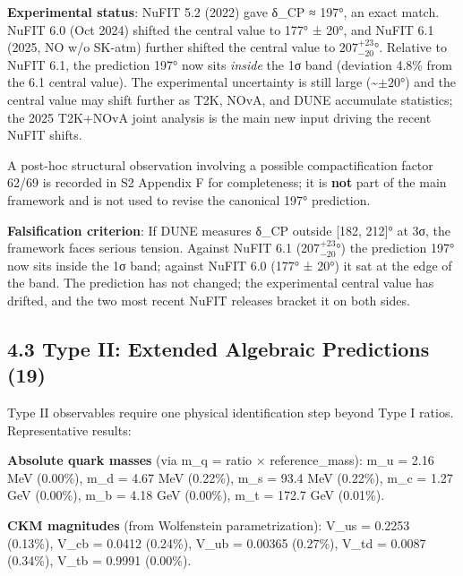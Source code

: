\documentclass[11pt,a4paper]{article}
\begin{document}
\textbf{Experimental status}: NuFIT 5.2 (2022) gave δ\_\allowbreak{}CP ≈ 197°, an exact match. NuFIT 6.0 (Oct 2024) shifted the central value to 177° ± 20°, and NuFIT 6.1 (2025, NO w/o SK-atm) further shifted the central value to \(207^{+23}_{-20}\)°. Relative to NuFIT 6.1, the prediction 197° now sits \emph{inside} the 1σ band (deviation 4.8\% from the 6.1 central value). The experimental uncertainty is still large (\textasciitilde{}\(\pm 20\)°) and the central value may shift further as T2K, NOvA, and DUNE accumulate statistics; the 2025 T2K+NOvA joint analysis \cite{26} is the main new input driving the recent NuFIT shifts.

A post-hoc structural observation involving a possible compactification factor 62/69 is recorded in S2 Appendix F for completeness; it is \textbf{not} part of the main framework and is not used to revise the canonical 197° prediction.

\textbf{Falsification criterion}: If DUNE measures δ\_\allowbreak{}CP outside {[}182, 212{]}° at 3σ, the framework faces serious tension. Against NuFIT 6.1 (207\(^{+23}_{-20}\)°) the prediction 197° now sits inside the 1σ band; against NuFIT 6.0 (177° ± 20°) it sat at the edge of the band. The prediction has not changed; the experimental central value has drifted, and the two most recent NuFIT releases bracket it on both sides.

\subsection{4.3 Type II: Extended Algebraic Predictions (19)}\label{type-ii-extended-algebraic-predictions-19}

Type II observables require one physical identification step beyond Type I ratios. Representative results:

\textbf{Absolute quark masses} (via m\_\allowbreak{}q = ratio × reference\_\allowbreak{}mass): m\_\allowbreak{}u = 2.16 MeV (0.00\%), m\_\allowbreak{}d = 4.67 MeV (0.22\%), m\_\allowbreak{}s = 93.4 MeV (0.22\%), m\_\allowbreak{}c = 1.27 GeV (0.00\%), m\_\allowbreak{}b = 4.18 GeV (0.00\%), m\_\allowbreak{}t = 172.7 GeV (0.01\%).

\textbf{CKM magnitudes} (from Wolfenstein parametrization): \textbar V\_\allowbreak{}us\textbar{} = 0.2253 (0.13\%), \textbar V\_\allowbreak{}cb\textbar{} = 0.0412 (0.24\%), \textbar V\_\allowbreak{}ub\textbar{} = 0.00365 (0.27\%), \textbar V\_\allowbreak{}td\textbar{} = 0.0087 (0.34\%), \textbar V\_\allowbreak{}tb\textbar{} = 0.9991 (0.00\%).
\end{document}
